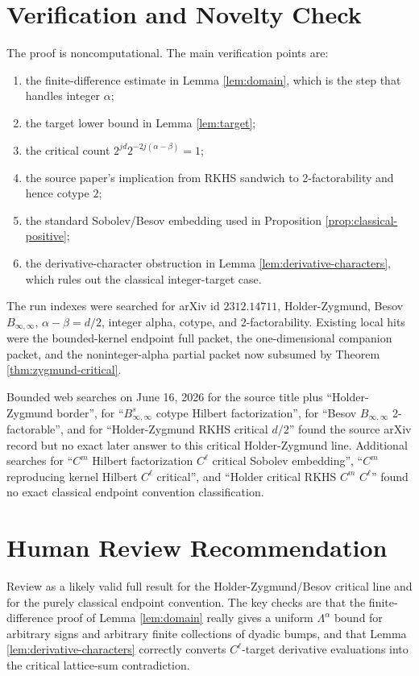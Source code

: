 \documentclass[11pt]{article}
\newcommand{\Lam}{\Lambda}
\begin{document}
\section*{Verification and Novelty Check}

The proof is noncomputational. The main verification points are:
\begin{enumerate}
\item the finite-difference estimate in Lemma \ref{lem:domain}, which is the
      step that handles integer \(\alpha\);
\item the target lower bound in Lemma \ref{lem:target};
\item the critical count \(2^{jd}2^{-2j(\alpha-\beta)}=1\);
\item the source paper's implication from RKHS sandwich to 2-factorability
      and hence cotype \(2\);
\item the standard Sobolev/Besov embedding used in Proposition
      \ref{prop:classical-positive};
\item the derivative-character obstruction in Lemma
      \ref{lem:derivative-characters}, which rules out the classical
      integer-target case.
\end{enumerate}

The run indexes were searched for arXiv id \(2312.14711\), Holder-Zygmund,
Besov \(B_{\infty,\infty}\), \(\alpha-\beta=d/2\), integer alpha, cotype, and
2-factorability. Existing local hits were the bounded-kernel endpoint full
packet, the one-dimensional companion packet, and the noninteger-alpha
partial packet now subsumed by Theorem \ref{thm:zygmund-critical}.

Bounded web searches on June 16, 2026 for the source title plus
``Holder-Zygmund border'', for
``\(B^s_{\infty,\infty}\) cotype Hilbert factorization'', for
``Besov \(B_{\infty,\infty}\) 2-factorable'', and for
``Holder-Zygmund RKHS critical \(d/2\)'' found the source arXiv record but no
exact later answer to this critical Holder-Zygmund line. Additional searches
for ``\(C^m\) Hilbert factorization \(C^\ell\) critical Sobolev embedding'',
``\(C^m\) reproducing kernel Hilbert \(C^\ell\) critical'', and
``Holder critical RKHS \(C^m\) \(C^\ell\)'' found no exact classical
endpoint convention classification.

\section*{Human Review Recommendation}

Review as a likely valid full result for the Holder-Zygmund/Besov critical
line and for the purely classical endpoint convention. The key checks are
that the finite-difference proof of Lemma \ref{lem:domain} really gives a
uniform \(\Lam^\alpha\) bound for arbitrary signs and arbitrary finite
collections of dyadic bumps, and that Lemma \ref{lem:derivative-characters}
correctly converts \(C^\ell\)-target derivative evaluations into the critical
lattice-sum contradiction.
\end{document}
